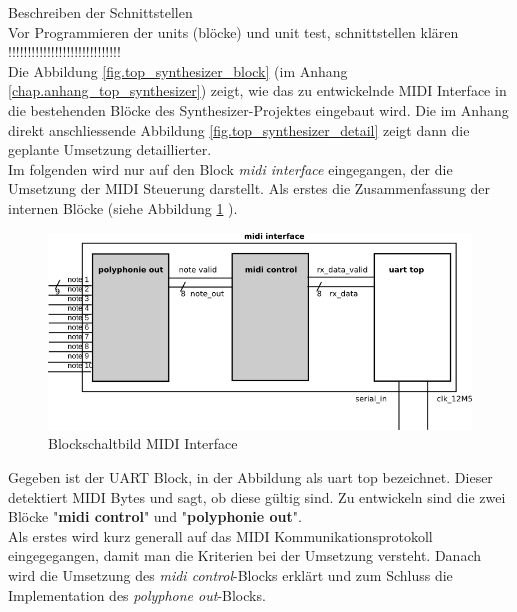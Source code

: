 Beschreiben der Schnittstellen\\
Vor Programmieren der units (blöcke) und unit test, schnittstellen klären \\
!!!!!!!!!!!!!!!!!!!!!!!!!!!!!\\
\newline
Die Abbildung \ref{fig.top_synthesizer_block} (im Anhang \ref{chap.anhang_top_synthesizer}) zeigt, wie das zu entwickelnde MIDI Interface in die bestehenden Blöcke des Synthesizer-Projektes eingebaut wird. Die im Anhang direkt anschliessende Abbildung \ref{fig.top_synthesizer_detail} zeigt dann die geplante Umsetzung detaillierter.\\
\newline
Im folgenden wird nur auf den Block \textit{midi interface} eingegangen, der die Umsetzung der MIDI Steuerung darstellt. Als erstes die Zusammenfassung der internen Blöcke (siehe Abbildung \ref{fig.midi_interface_block} ).\\
\begin{figure}[H]
	\centering
	\includegraphics[width=1\textwidth]{images/midi_interface/midi_interface_block.png}
	\caption{Blockschaltbild MIDI Interface}
	\label{fig.midi_interface_block}
\end{figure}

Gegeben ist der UART Block, in der Abbildung als uart top bezeichnet. Dieser detektiert MIDI Bytes und sagt, ob diese gültig sind. Zu entwickeln sind die zwei Blöcke "\textbf{midi control}" und "\textbf{polyphonie out}".\\

Als erstes wird kurz generall auf das MIDI Kommunikationsprotokoll eingegegangen, damit man die Kriterien bei der Umsetzung versteht. Danach wird die Umsetzung des \textit{midi control}-Blocks erklärt und zum Schluss die Implementation des \textit{polyphone out}-Blocks.\\



